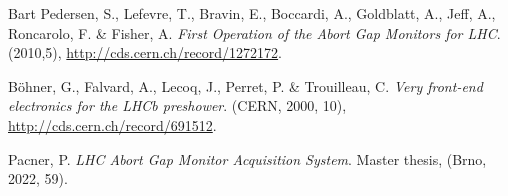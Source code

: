 {\begin{thebibliography}{99}
        Bart Pedersen, S., Lefevre, T., Bravin, E., Boccardi, A.,
          Goldblatt, A., Jeff, A., Roncarolo, F. \& Fisher, A. \emph{First Operation of
          the Abort Gap Monitors for LHC}.  (2010,5), \url{http://cds.cern.ch/record/1272172}.

         Böhner, G., Falvard, A., Lecoq, J., Perret, P. \& Trouilleau,
            C. \emph{Very front-end electronics for the LHCb preshower}. (CERN, 2000, 10), \url{http://cds.cern.ch/record/691512}.

        Pacner, P. \emph{LHC Abort Gap Monitor
            Acquisition System}. Master thesis, (Brno, 2022, 59).




% 

    \end{thebibliography}
} %

